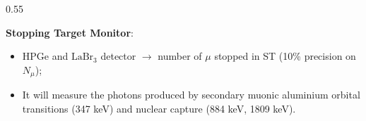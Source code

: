 \documentclass{beamer}
\begin{document}
\begin{frame}
\begin{columns}
\begin{column}{0.55\framewidth}
\begin{figure}[h]
        \end{figure}
        \textbf{Stopping Target Monitor}:
            \begin{itemize}
                \item HPGe and  $ \text{LaBr}_3$ detector $\rightarrow$ number of $\mu$ stopped in ST (10\% precision on $N_\mu$);
                \item It will measure the photons produced by secondary muonic aluminium orbital transitions (347 keV) and nuclear capture (884 keV, 1809 keV).
            
            \end{itemize}
                         
            \end{column}
    \end{columns}
\end{frame}
\end{document}
